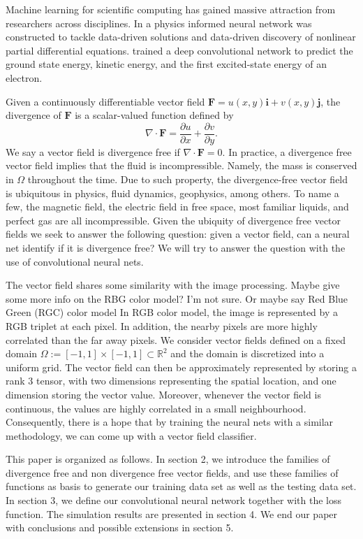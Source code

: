 \documentclass[review,leqno]{siamart1116}
\let\cite=\citet
\newcommand{\eric}[1]{{\color{blue}#1}}
\newcommand{\justin}[1]{{\color{violet}#1}}
\def\bF{\mathbf F}
\def\bi{\mathbf i}
\def\bj{\mathbf j}
\begin{document}
Machine learning for scientific computing has gained massive attraction 
from researchers across disciplines. 
In \cite{RPK2017a,RPK2017b} a physics informed neural network was constructed 
to tackle data-driven solutions and data-driven discovery of nonlinear 
partial differential equations.
\cite{MST2017} trained a deep convolutional network to predict the ground state energy, kinetic energy, and the first excited-state energy of an electron.


Given a continuously differentiable vector field 
$\bF = u(x,y)\bi + v(x,y)\bj$, 
the divergence of $\bF$ is a scalar-valued function defined by
\[\nabla \cdot \bF = \frac{\partial u}{\partial x} 
+ \frac{\partial v}{\partial y}.\]
We say a vector field is divergence free if $\nabla \cdot \bF = 0$.
In practice, a divergence free vector field implies that the fluid is incompressible. 
Namely, the mass is conserved in $\Omega$ throughout the time. 
Due to such property, the divergence-free vector field is ubiquitous 
in physics, fluid dynamics, geophysics, among others.
To name a few, the magnetic field, the electric field in free space, most familiar liquids, 
and perfect gas are all incompressible. \justin{Given the ubiquity of divergence free vector fields we seek to answer the following question: given a vector field, can a neural net identify if it is divergence free?} We will try to answer the question with the use of convolutional neural nets.

The vector field shares some similarity with the image processing. \eric{Maybe give some more info on the RBG color model? I'm not sure. Or maybe say Red Blue Green (RGC) color model}
In RGB color model, the image is represented by a RGB triplet at each pixel.
In addition, the nearby pixels are more highly correlated than the far away pixels. We consider vector fields defined on a fixed domain \justin{$\Omega:=[-1,1]\times[-1,1] \subset \mathbb{R}^2$ and the domain is discretized into a uniform grid.} The vector field can then be approximately represented by storing a rank 3 tensor,
with two dimensions representing the spatial location, 
and one dimension storing the vector value. Moreover, whenever the vector field is continuous, the values are highly correlated in a small neighbourhood. 
Consequently, there is a hope that by training the neural nets with a similar methodology,
we can come up with a vector field classifier.

This paper is organized as follows.
In section 2, we introduce the families of divergence free and non divergence free vector fields, and use these families of functions as basis to generate our training data set as well as the testing data set.
In section 3, we define our convolutional neural network together with the loss function.
The simulation results are presented in section 4.
We end our paper with conclusions and possible extensions in section 5.
\end{document}
